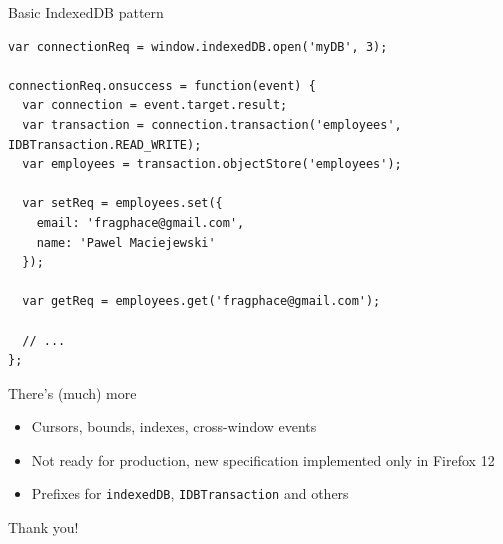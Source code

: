 \documentclass[xetex]{beamer}
\begin{document}
    \begin{frame}[containsverbatim]{Basic IndexedDB pattern}
      \begin{lstlisting}
var connectionReq = window.indexedDB.open('myDB', 3);

connectionReq.onsuccess = function(event) {
  var connection = event.target.result;
  var transaction = connection.transaction('employees', IDBTransaction.READ_WRITE);
  var employees = transaction.objectStore('employees');

  var setReq = employees.set({ 
    email: 'fragphace@gmail.com',
    name: 'Pawel Maciejewski'
  });

  var getReq = employees.get('fragphace@gmail.com');

  // ...
};
      \end{lstlisting}
    \end{frame}

    \begin{frame}[containsverbatim]{There's (much) more}
      \begin{itemize}
        \item Cursors, bounds, indexes, cross-window events
        \item Not ready for production, new specification implemented only in Firefox 12
        \item Prefixes for \verb|indexedDB|, \verb|IDBTransaction| and others        
      \end{itemize}
    \end{frame}
    
    \begin{frame}[plain]
      \begin{center}
        \Huge Thank you!
      \end{center}
    \end{frame}

            
\end{document}
